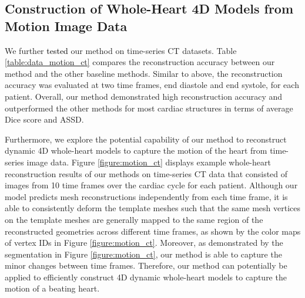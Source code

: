 \documentclass[times,review,preprint,authoryear]{elsarticle}
\begin{document}
\subsection{Construction of Whole-Heart 4D Models from Motion Image Data}
We further \textcolor{black}{tested} our method on time-series CT datasets. Table \ref{table:data_motion_ct} compares the reconstruction accuracy between our method and the other baseline methods. Similar to above, the reconstruction accuracy was evaluated at two time frames, end diastole and end systole, for each patient. Overall, our method demonstrated high reconstruction accuracy and outperformed the other methods for most cardiac structures in terms of average Dice score and ASSD. 

Furthermore, we explore the potential capability of our method to reconstruct dynamic 4D whole-heart models to capture the motion of the heart from time-series image data. Figure \ref{figure:motion_ct} displays example whole-heart reconstruction results of our methods on time-series CT data that consisted of images from 10 time frames over the cardiac cycle for each patient. Although our model predicts mesh reconstructions independently from each time frame, it is able to consistently deform the template meshes such that the same mesh vertices on the template meshes are generally mapped to the same region of the reconstructed geometries across different time frames, as shown by the color maps of vertex IDs in Figure \ref{figure:motion_ct}. Moreover, as demonstrated by the segmentation in Figure \ref{figure:motion_ct}, our method is able to capture the minor changes between time frames. Therefore, our method can potentially be applied to efficiently construct 4D dynamic whole-heart models to capture the motion of a beating heart. 
\end{document}
